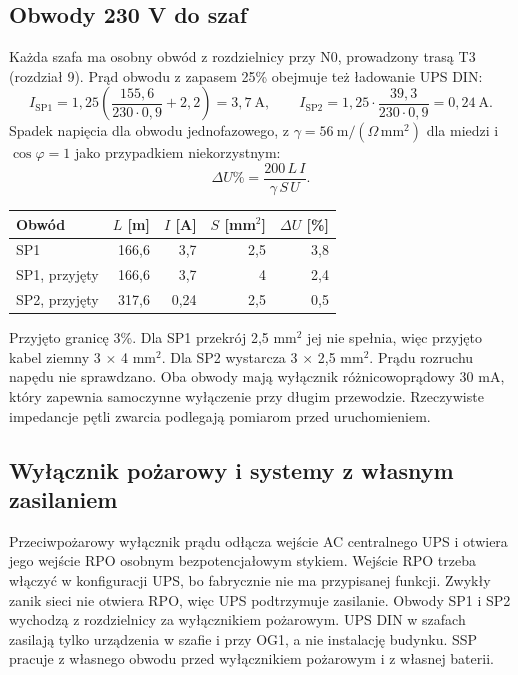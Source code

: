 \subsection*{Obwody 230 V do szaf}
Każda szafa ma osobny obwód z rozdzielnicy przy N0, prowadzony trasą T3 (rozdział 9). Prąd obwodu z zapasem 25\% obejmuje też ładowanie UPS DIN:
\[
I_{\mathrm{SP1}} = 1{,}25\left(\frac{155{,}6}{230\cdot0{,}9}+2{,}2\right)=3{,}7\ \mathrm{A},\qquad
I_{\mathrm{SP2}} = 1{,}25\cdot\frac{39{,}3}{230\cdot0{,}9}=0{,}24\ \mathrm{A}.
\]
Spadek napięcia dla obwodu jednofazowego, z $\gamma=56\ \mathrm{m}/(\Omega\,\mathrm{mm}^2)$ dla miedzi i $\cos\varphi=1$ jako przypadkiem niekorzystnym:
\[
\Delta U\% = \frac{200\,L\,I}{\gamma\,S\,U}.
\]
\begin{center}
\small
\begin{tabular}{@{}lrrrr@{}}
\toprule
Obwód & $L$ [m] & $I$ [A] & $S$ [mm$^2$] & $\Delta U$ [\%] \\
\midrule
SP1 & 166,6 & 3,7 & 2,5 & 3,8 \\
SP1, przyjęty & 166,6 & 3,7 & 4 & 2,4 \\
SP2, przyjęty & 317,6 & 0,24 & 2,5 & 0,5 \\
\bottomrule
\end{tabular}
\end{center}
Przyjęto granicę 3\%.\cite{OWN} Dla SP1 przekrój 2,5 mm$^2$ jej nie spełnia, więc przyjęto kabel ziemny 3 $\times$ 4 mm$^2$. Dla SP2 wystarcza 3 $\times$ 2,5 mm$^2$. Prądu rozruchu napędu nie sprawdzano. Oba obwody mają wyłącznik różnicowoprądowy 30 mA, który zapewnia samoczynne wyłączenie przy długim przewodzie. Rzeczywiste impedancje pętli zwarcia podlegają pomiarom przed uruchomieniem.

\subsection*{Wyłącznik pożarowy i systemy z własnym zasilaniem}
Przeciwpożarowy wyłącznik prądu odłącza wejście AC centralnego UPS i otwiera jego wejście RPO osobnym bezpotencjałowym stykiem. Wejście RPO trzeba włączyć w konfiguracji UPS, bo fabrycznie nie ma przypisanej funkcji. Zwykły zanik sieci nie otwiera RPO, więc UPS podtrzymuje zasilanie.\cite{S-UPS-GUIDE} Obwody SP1 i SP2 wychodzą z rozdzielnicy za wyłącznikiem pożarowym. UPS DIN w szafach zasilają tylko urządzenia w szafie i przy OG1, a nie instalację budynku. SSP pracuje z własnego obwodu przed wyłącznikiem pożarowym i z własnej baterii.\cite{S-FIRE}
